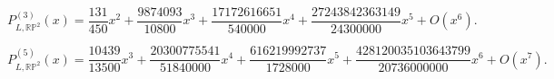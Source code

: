 \begin{equation}
P_{L,\mathbb{RP}^2}^{(3)}(x)=\frac{131}{450}x^{2}+\frac{9874093}{10800}x^{3}+\frac{17172616651}{540000}x^{4}+\frac{27243842363149}{24300000}x^{5}+O(x^{6}).
\end{equation}

\begin{equation}
P_{L,\mathbb{RP}^2}^{(5)}(x)=\frac{10439}{13500}x^{3}+\frac{20300775541}{51840000}x^{4}+\frac{616219992737}{1728000}x^{5}+\frac{428120035103643799}{20736000000}x^{6}+O(x^{7}).
\end{equation}
